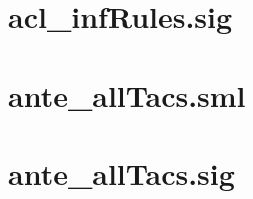 \begin{scriptsize}


  \begin{alltt}
    
  \end{alltt}

% 


\end{scriptsize}

\section{acl\_infRules.sig}

\begin{scriptsize}

  \begin{alltt}
    
  \end{alltt}

% 


\end{scriptsize}

\section{ante_allTacs.sml}

\begin{scriptsize}

  \begin{alltt}
    
  \end{alltt}

% 


\end{scriptsize}

\section{ante_allTacs.sig}

\begin{scriptsize}

  \begin{alltt}
    
  \end{alltt}

% 


\end{scriptsize}

